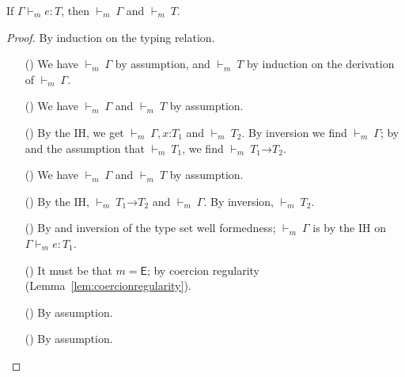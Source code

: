 \documentclass[9pt]{extarticle}
\newcommand{\ottnt}[1]{\mathit{#1}}
\newcommand{\ottsym}[1]{#1}
\begin{document}
\begin{lemma}[Regularity]
  \label{lem:regularity}
  If $ \Gamma   \vdash _{ \ottnt{m} }  \ottnt{e}  :  \ottnt{T} $, then $ \mathord{  \vdash _{ \ottnt{m} } }~ \Gamma $ and $ \mathord{  \vdash _{ \ottnt{m} } }~ \ottnt{T} $.
{\iffull
  \begin{proof}
    By induction on the typing relation.
\begin{itemize}
    \item[(\T{Var})] We have $ \mathord{  \vdash _{ \ottnt{m} } }~ \Gamma $ by assumption, and $ \mathord{  \vdash _{ \ottnt{m} } }~ \ottnt{T} $
      by induction on the derivation of $ \mathord{  \vdash _{ \ottnt{m} } }~ \Gamma $.

    \item[(\T{Const})] We have $ \mathord{  \vdash _{ \ottnt{m} } }~ \Gamma $ and $ \mathord{  \vdash _{ \ottnt{m} } }~ \ottnt{T} $ by assumption.

    \item[(\T{Abs})] By the IH, we get $ \mathord{  \vdash _{ \ottnt{m} } }~  \Gamma , \mathit{x} \mathord{:} \ottnt{T_{{\mathrm{1}}}}  $ and $ \mathord{  \vdash _{ \ottnt{m} } }~ \ottnt{T_{{\mathrm{2}}}} $. By inversion we find $ \mathord{  \vdash _{ \ottnt{m} } }~ \Gamma $; by  and the
      assumption that $ \mathord{  \vdash _{ \ottnt{m} } }~ \ottnt{T_{{\mathrm{1}}}} $, we find $ \mathord{  \vdash _{ \ottnt{m} } }~  \ottnt{T_{{\mathrm{1}}}} \mathord{ \rightarrow } \ottnt{T_{{\mathrm{2}}}}  $.

    \item[(\T{Op})] We have $ \mathord{  \vdash _{ \ottnt{m} } }~ \Gamma $ and $ \mathord{  \vdash _{ \ottnt{m} } }~ \ottnt{T} $ by assumption.

    \item[(\T{App})] By the IH, $ \mathord{  \vdash _{ \ottnt{m} } }~  \ottnt{T_{{\mathrm{1}}}} \mathord{ \rightarrow } \ottnt{T_{{\mathrm{2}}}}  $ and $ \mathord{  \vdash _{ \ottnt{m} } }~ \Gamma $. By
      inversion, $ \mathord{  \vdash _{ \ottnt{m} } }~ \ottnt{T_{{\mathrm{2}}}} $.

    \item[(\T{Cast})] By  and inversion of the type set well
      formedness; $ \mathord{  \vdash _{ \ottnt{m} } }~ \Gamma $ is by the IH on $ \Gamma   \vdash _{ \ottnt{m} }  \ottnt{e}  :  \ottnt{T_{{\mathrm{1}}}} $.

    \item[(\T{Coerce})] It must be that $\ottnt{m}  \ottsym{=}   \mathsf{E} $; by coercion
      regularity (Lemma~\ref{lem:coercionregularity}).

    \item[(\T{Blame})] By assumption.

    \item[(\T{Check})] By assumption.

    \end{itemize}
  \end{proof}
  \fi}
\end{lemma}
\end{document}
